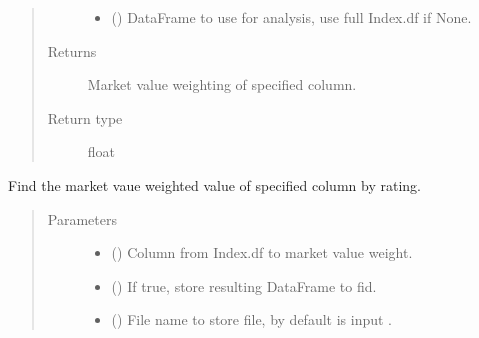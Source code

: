 \documentclass[letterpaper,10pt,english]{report}
\begin{document}
\begin{fulllineitems}
\begin{fulllineitems}
\begin{quote}
\begin{description}
\begin{itemize}
\item {} 
 (\sphinxstyleliteralemphasis{\sphinxupquote{, }}) \textendash{} DataFrame to use for analysis, use full Index.df if None.

\end{itemize}

\item[{Returns}] \leavevmode
{} \textendash{} Market value weighting of specified column.

\item[{Return type}] \leavevmode
float

\end{description}\end{quote}

\end{fulllineitems}


\begin{fulllineitems}
\label{\detokenize{index:lgimapy.index.Index.subset_value_by_rating}}
Find the market vaue weighted value of specified
column by rating.
\begin{quote}\begin{description}
\item[{Parameters}] \leavevmode\begin{itemize}
\item {} 
 () \textendash{} Column from Index.df to market value weight.

\item {} 
 () \textendash{} If true, store resulting DataFrame to fid.

\item {} 
 (\sphinxstyleliteralemphasis{\sphinxupquote{, }}) \textendash{} File name to store file, by default is input .


\end{itemize}
\end{description}
\end{quote}
\end{fulllineitems}
\end{fulllineitems}
\end{document}
